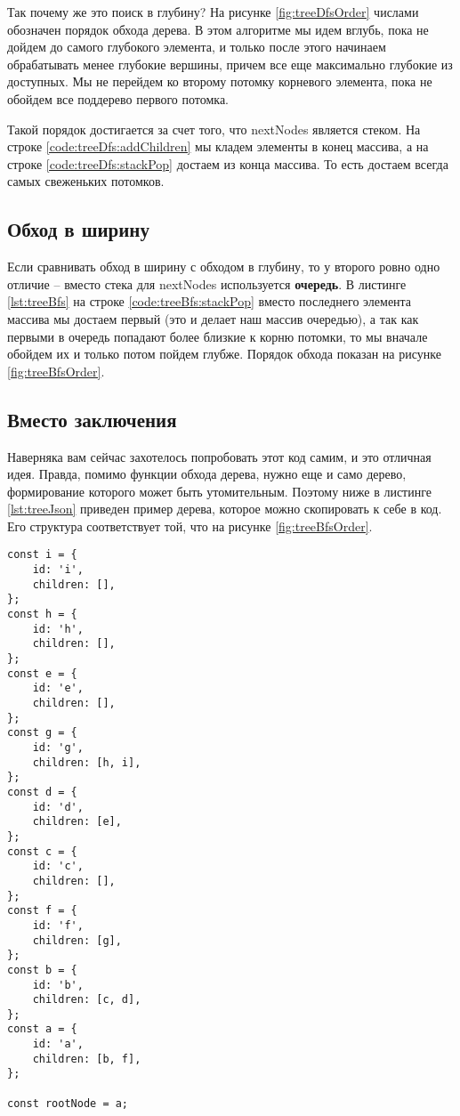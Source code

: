 \documentclass[../../article]{subfiles}
\begin{document}
Так почему же это поиск в глубину? На рисунке \ref{fig:treeDfsOrder} числами обозначен порядок обхода дерева. В этом алгоритме мы идем вглубь, пока не дойдем до самого глубокого элемента, и только после этого начинаем обрабатывать менее глубокие вершины, причем все еще максимально глубокие из доступных. Мы не перейдем ко второму потомку корневого элемента, пока не обойдем все поддерево первого потомка.

Такой порядок достигается за счет того, что {\firacodebold nextNodes} является стеком. На строке \ref{code:treeDfs:addChildren} мы кладем элементы в конец массива, а на строке \ref{code:treeDfs:stackPop} достаем из конца массива. То есть достаем всегда самых свеженьких потомков.

\subsection{Обход в ширину}

Если сравнивать обход в ширину с обходом в глубину, то у второго ровно одно отличие – вместо стека для {\firacodebold nextNodes} используется {\bfseries очередь}. В листинге \ref{lst:treeBfs} на строке \ref{code:treeBfs:stackPop} вместо последнего элемента массива мы достаем первый (это и делает наш массив очередью), а так как первыми в очередь попадают более близкие к корню потомки, то мы вначале обойдем их и только потом пойдем глубже. Порядок обхода показан на рисунке \ref{fig:treeBfsOrder}.

\subsection{Вместо заключения}
Наверняка вам сейчас захотелось попробовать этот код самим, и это отличная идея. Правда, помимо функции обхода дерева, нужно еще и само дерево, формирование которого может быть утомительным. Поэтому ниже в листинге \ref{lst:treeJson} приведен пример дерева, которое можно скопировать к себе в код. Его структура соответствует той, что на рисунке \ref{fig:treeBfsOrder}.

\begin{ruledelement}
    \begin{lstlisting}[caption={Пример {\firacodebold rootNode}}, label={lst:treeJson}]
const i = {
    id: 'i',
    children: [],
};
const h = {
    id: 'h',
    children: [],
};
const e = {
    id: 'e',
    children: [],
};
const g = {
    id: 'g',
    children: [h, i],
};
const d = {
    id: 'd',
    children: [e],
};
const c = {
    id: 'c',
    children: [],
};
const f = {
    id: 'f',
    children: [g],
};
const b = {
    id: 'b',
    children: [c, d],
};
const a = {
    id: 'a',
    children: [b, f],
};

const rootNode = a;
    \end{lstlisting}
\end{ruledelement}
\end{document}
